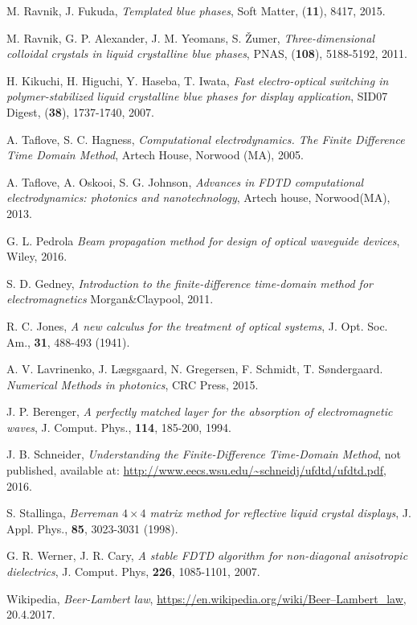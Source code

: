\documentclass[longbibliography,slovene,a4paper,12pt]{book}
\begin{document}
\begin{thebibliography}{15}
	M. Ravnik, J. Fukuda,
	\emph{Templated blue phases},
	Soft Matter, (\textbf{11}), 8417, 2015.
	
	M. Ravnik, G. P. Alexander, J. M. Yeomans, S. Žumer,
	\emph{Three-dimensional colloidal crystals in liquid crystalline blue phases},
	PNAS, (\textbf{108}), 5188-5192, 2011.
	
	H. Kikuchi, H. Higuchi, Y. Haseba, T. Iwata,
	\emph{Fast electro-optical switching in polymer-stabilized liquid crystalline blue phases for display application},
	SID07 Digest, (\textbf{38}), 1737-1740, 2007.
	

	A. Taflove, S. C. Hagness,
	\emph{Computational electrodynamics. The Finite Difference Time Domain Method},
	Artech House, Norwood (MA), 2005.
	
	A. Taflove, A. Oskooi, S. G. Johnson,
	\emph{Advances in FDTD computational electrodynamics: photonics and nanotechnology},
	Artech house, Norwood(MA), 2013.
	
	G. L. Pedrola
	\emph{Beam propagation method for design of optical waveguide devices},
	Wiley, 2016.	

	S. D. Gedney,
	\emph{Introduction to the finite-difference time-domain method for electromagnetics}
	Morgan\&Claypool, 2011.
	
	R. C. Jones,
	\emph{A new calculus for the treatment of optical systems},
	J. Opt. Soc. Am., \textbf{31}, 488-493 (1941).

	A. V. Lavrinenko, J. Lægsgaard, N. Gregersen, F. Schmidt, T. Søndergaard.
	\emph{Numerical Methods in photonics},
	CRC Press, 2015.

	 J. P. Berenger, \emph{A perfectly matched layer for the absorption of electromagnetic waves},
	 J. Comput. Phys., \textbf{114}, 185-200, 1994.
	 
	J. B. Schneider,
	\emph{Understanding the Finite-Difference Time-Domain Method},
	not published, available at: \url{http://www.eecs.wsu.edu/~schneidj/ufdtd/ufdtd.pdf}, 2016.

	S. Stallinga,
	\emph{Berreman $4 \times 4$ matrix method for reflective liquid crystal displays},
	J. Appl. Phys., \textbf{85}, 3023-3031 (1998).

	G. R. Werner, J. R. Cary,
	\emph{A stable FDTD algorithm for non-diagonal anisotropic dielectrics},
	J. Comput. Phys, \textbf{226}, 1085-1101, 2007.
	 
	Wikipedia, \emph{Beer-Lambert law},
	\url{https://en.wikipedia.org/wiki/Beer–Lambert_law}, 20.4.2017.


\end{thebibliography}
\end{document}
